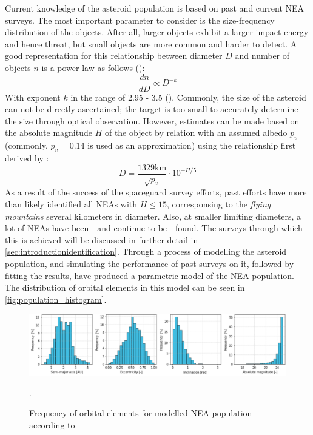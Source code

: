 Current knowledge of the asteroid population is based on past and current NEA surveys. The most important parameter to consider is the size-frequency distribution of the objects. After all, larger objects exhibit a larger impact energy and hence threat, but small objects are more common and harder to detect. A good representation for this relationship between diameter $D$ and number of objects $n$ is a power law as follows (\cite{HarrisPopulation}):
\begin{equation}
 \frac{dn}{dD} \propto D^{-k}
 \label{eq:sizefreqlaw}
\end{equation}
With exponent $k$ in the range of 2.95 - 3.5 (\cite{AsteroidSizeFrequency}). Commonly, the size of the asteroid can not be directly ascertained; the target is too small to accurately determine the size through optical observation. However, estimates can be made based on the absolute magnitude $H$ of the object by relation with an assumed albedo $p_v$ (commonly, $p_v = 0.14$ is used as an approximation) using the relationship first derived by \cite{AsteroidSizeAlbedo}:
\begin{equation}
 D = \frac{1329 \mathrm{km}}{\sqrt{p_v}}\cdot 10^{-H/5}
 \label{eq:asteroidsize}
\end{equation}
As a result of the success of the spaceguard survey efforts, past efforts have more than likely identified all NEAs with $H \leq 15$, corresponsing to the \textit{flying mountains} several kilometers in diameter. Also, at smaller limiting diameters, a lot of NEAs have been - and continue to be - found. The surveys through which this is achieved will be discussed in further detail in \autoref{sec:introductionidentification}. Through a process of modelling the asteroid population, and simulating the performance of past surveys on it, followed by fitting the results, \cite{GranvikPopulation} have produced a parametric model of the NEA population. The distribution of orbital elements in this model can be seen in \autoref{fig:population_histogram}. \\

\begin{figure}[htbp]
 \centering
 \includegraphics[width=1.0\textwidth]{img/population_histogram.png}
 \caption{Frequency of orbital elements for modelled NEA population according to \cite{GranvikPopulation}}.
 \label{fig:population_histogram}
\end{figure}

